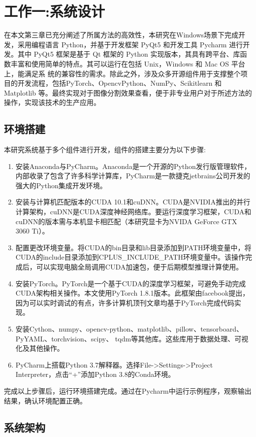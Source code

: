 
\chapter{工作一:系统设计}
在本文第三章已充分阐述了所属方法的高效性，本研究在Win­dows场景下完成开发，采用编程语言 Python，并基于开发框架 PyQt5 和开发工具 Pycharm 进行开发。其中 PyQt5 框架是基于 Qt 框架的 Python 实现版本，其具有跨平台、库函数丰富和使用简单的特点。其可以运行在包括 Unix，Windows 和 Mac OS 平台上，能满足系
统的兼容性的需求。除此之外，涉及众多开源组件用于支撑整个项目的开发流程，包括PyTorch、Opencv­Python、NumPy、Scikit­learn 和 Matplotlib 等。最终实现对于图像分割效果查看，便于非专业用户对于所述方法的操作，实现该技术的生产应用。
\section{环境搭建}
本研究系统基于多个组件进行开发，组件的搭建主要分为以下步骤:
\begin{enumerate}
    \item 安装Anaconda与PyCharm。Anaconda是一个开源的Python发行版管理软件，内部收录了包含了许多科学计算库，PyCharm是一款捷克jetbrains公司开发的强大的Python集成开发环境。
    \item 安装与计算机匹配版本的CUDA 10.1和cuDNN。CUDA是NVIDIA推出的并行计算架构，cuDNN是CUDA深度神经网络库。要运行深度学习框架，CUDA和cuDNN的版本需与本机显卡相匹配（本研究显卡为NVIDA GeForce GTX 3060 Ti）。
    \item 配置更改环境变量。将CUDA的bin目录和lib目录添加到PATH环境变量中，将CUDA的include目录添加到CPLUS\_INCLUDE\_PATH环境变量中。该操作完成后，可以实现电脑全局调用CUDA加速包，便于后期模型推理计算使用。
    \item 安装PyTorch。PyTorch是一个基于CUDA的深度学习框架，可避免手动完成CUDA架构相关操作。本文使用PyTorch 1.8.1版本。此框架由facebook提出，因为可以实时调试的有点，许多计算机顶刊文章均基于PyTorch完成代码实现。
    \item 安装Cython、numpy、opencv-python、matplotlib、pillow、tensorboard、PyYAML、torchvision、scipy、 tqdm等其他库。这些库用于数据处理、可视化及其他操作。
    \item PyCharm上搭载Python 3.7解释器。选择File->Settings->Project Interpreter，点击“+”添加Python 3.8的Conda环境。
\end{enumerate}

完成以上步骤后，运行环境搭建完成。通过在Pycharm中运行示例程序，观察输出结果，确认环境配置正确。

\section{系统架构}
